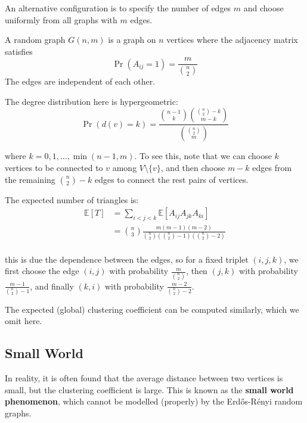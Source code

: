\documentclass{article}
\begin{document}
An alternative configuration is to specify the number of edges $m$ and choose uniformly from all graphs with $m$ edges. 

\begin{definition}
    A random graph $G(n,m)$ is a graph on $n$ vertices where the adjacency matrix satisfies
    \begin{equation*}
        \Pr(A_{ij}=1)=\frac{m}{\binom{n}{2}}
    \end{equation*}
    The edges are independent of each other.
\end{definition}

The degree distribution here is hypergeometric:
$$
\Pr(d(v)=k)=\frac{\binom{n-1}{k}\binom{\binom{n}{2}-k}{m-k}}{\binom{\binom{n}{2}}{m}}
$$

where $k=0,1,\ldots,\min(n-1,m)$. To see this, note that we can choose $k$ vertices to be connected to $v$ among $V\setminus \{v\}$, and then choose $m-k$ edges from the remaining $\binom{n}{2}-k$ edges to connect the rest pairs of vertices. 

The expected number of triangles is:
\begin{align*}
    \mathbb{E}[T]&=\sum_{i<j<k} \mathbb{E}[A_{ij}A_{jk}A_{ki}]\\
    &=\binom{n}{3}\frac{m(m-1)(m-2)}{\binom{n}{2}\left(\binom{n}{2}-1\right)\left(\binom{n}{2}-2\right)}\\
\end{align*}

this is due the dependence between the edges, so for a fixed triplet $(i,j,k)$, we first choose the edge $(i,j)$ with probability $\frac{m}{\binom{n}{2}}$, then $(j,k)$ with probability $\frac{m-1}{\binom{n}{2}-1}$, and finally $(k,i)$ with probability $\frac{m-2}{\binom{n}{2}-2}$.  

The expected (global) clustering coefficient can be computed similarly, which we omit here.  

\subsection{Small World}

In reality, it is often found that the average distance between two vertices is small, but the clustering coefficient is large. This is known as the \textbf{small world phenomenon}, which cannot be modelled (properly) by the Erd\H{o}s-R\'{e}nyi random graphs.  
\end{document}
